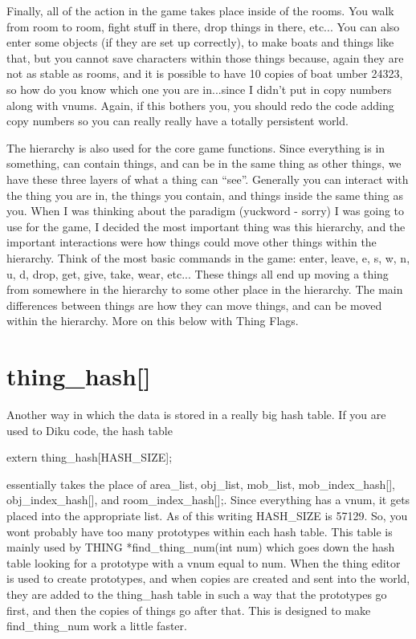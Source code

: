 Finally, all of the action in the game takes place inside of the
rooms. You walk from room to room, fight stuff in there, drop things
in there, etc... You can also enter some objects (if they are set up
correctly), to make boats and things like that, but you cannot save
characters within those things because, again they are not as stable
as rooms, and it is possible to have 10 copies of boat umber 24323, so
how do you know which one you are in...since I didn't put in copy
numbers along with vnums. Again, if this bothers you, you should redo
the code adding copy numbers so you can really really have a totally
persistent world.

The hierarchy is also used for the core game functions. Since
everything is in something, can contain things, and can be in the same
thing as other things, we have these three layers of what a thing can
``see''. Generally you can interact with the thing you are in, the
things you contain, and things inside the same thing as you. When I
was thinking about the paradigm (yuckword - sorry) I was going to use
for the game, I decided the most important thing was this hierarchy,
and the important interactions were how things could move other things
within the hierarchy. Think of the most basic commands in the game:
enter, leave, e, s, w, n, u, d, drop, get, give, take, wear,
etc... These things all end up moving a thing from somewhere in the
hierarchy to some other place in the hierarchy. The main differences
between things are how they can move things, and can be moved within
the hierarchy. More on this below with Thing Flags.

\section{thing\_hash[]}

Another way in which the data is stored in a really big hash
table. If you are used to Diku code, the hash table

extern thing\_hash[HASH\_SIZE];

essentially takes the place of area\_list, obj\_list, mob\_list,
mob\_index\_hash[], obj\_index\_hash[], and room\_index\_hash[];. Since
everything has a vnum, it gets placed into the appropriate list. As of
this writing HASH\_SIZE is 57129. So, you wont probably have too many
prototypes within each hash table. This table is mainly used by THING
*find\_thing\_num(int num) which goes down the hash table looking for a
prototype with a vnum equal to num. When the thing editor is used to
create prototypes, and when copies are created and sent into the world,
they are added to the thing\_hash table in such a way that the prototypes
go first, and then the copies of things go after that. This is designed
to make find\_thing\_num work a little faster.  

